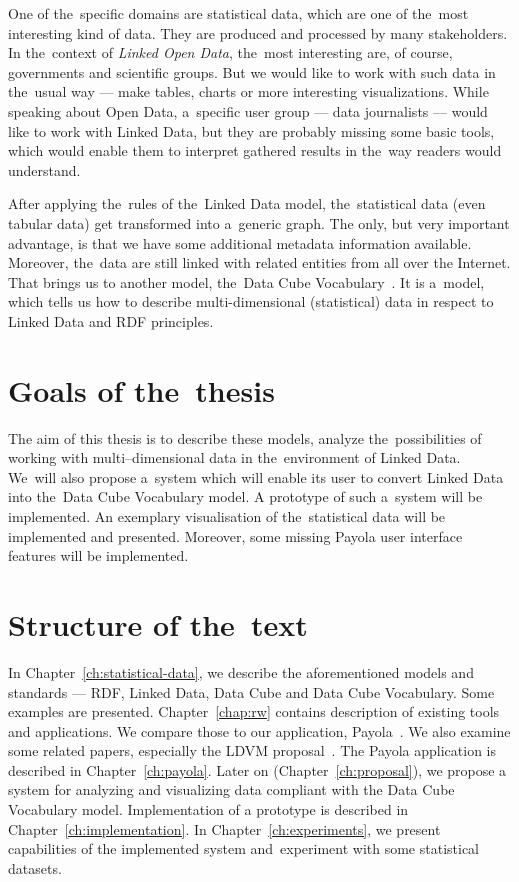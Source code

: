 One of the~specific domains are statistical data, which are one of the~most interesting kind
of data. They are produced and processed by many stakeholders. In the~context of
\emph{Linked Open Data}, the~most interesting are, of course, governments and scientific groups.
But we would like to work with such data in the~usual
way --- make tables, charts or more interesting visualizations. While speaking about Open Data, a~specific
user group --- data journalists --- would like to work with Linked Data, but they are probably
missing some basic tools, which would enable them to interpret gathered results
in the~way readers would understand.

After applying the~rules of the~Linked Data model, the~statistical data (even tabular data)
get transformed into a~generic graph. The only, but very important advantage, is that we have some additional
metadata information available. Moreover, the~data are still linked with related entities from all over the Internet.
That brings
us to another model, the~Data Cube Vocabulary~\cite{dcv}. It is a~model, which tells us how to describe
multi-dimensional (statistical) data in respect to Linked Data and RDF 
principles.

\section*{Goals of the~thesis}

The aim of this thesis is to describe these models, analyze the~possibilities of 
working
with multi--dimensional data in the~environment of Linked Data. We~will also propose a~system
which will enable its user to convert Linked Data into the~Data Cube Vocabulary model.
A prototype of such a~system will be implemented. An exemplary visualisation of the~statistical
data will be implemented and presented. Moreover, some missing Payola user interface features 
will be implemented.

\section*{Structure of the~text}
In Chapter~\ref{ch:statistical-data}, we describe the aforementioned 
models and standards --- RDF, Linked Data, Data Cube and Data Cube Vocabulary. 
Some examples are presented. Chapter~\ref{chap:rw} contains description of 
existing tools and applications. We compare those to our application, Payola~\cite{payola}.
We also examine some related papers, especially the LDVM proposal~\cite{ldvm}. 
The Payola application is described in Chapter~\ref{ch:payola}. Later on (Chapter~\ref{ch:proposal}),
we propose a system
for analyzing and visualizing data compliant with the Data Cube Vocabulary model.
Implementation of a prototype is described in Chapter~\ref{ch:implementation}.
In Chapter~\ref{ch:experiments}, we present capabilities of the implemented system
and~experiment with some statistical datasets.